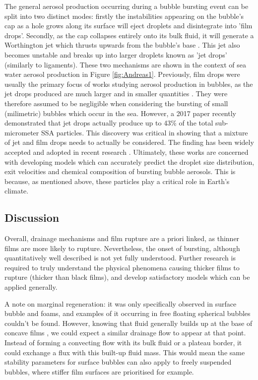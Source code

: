 \documentclass[a4paper,12pt]{article}
\numberwithin{equation}{section}
\numberwithin{figure}{section}
\numberwithin{table}{section}
\begin{document}
The general aerosol production occurring during a bubble bursting event can be split into two distinct modes: firstly the instabilities appearing on the bubble's cap as a hole grows along its surface will eject droplets and disintegrate into 'film drops'. Secondly, as the cap collapses entirely onto its bulk fluid, it will generate a Worthington jet which thrusts upwards from the bubble's base \cite{Lhuissier2011}. This jet also becomes unstable and breaks up into larger droplets known as 'jet drops' \cite{Spiel1998, Lhuissier2011} (similarly to ligaments). These two mechanisms are shown in the context of sea water aerosol production in Figure \ref{fig:Andreas1}. Previously, film drops were usually the primary focus of works studying aerosol production in bubbles, as the jet drops produced are much larger and in smaller quantities \cite{Wu1989, Modini2013, Spiel1998, Lhuissier2011}. They were therefore assumed to be negligible when considering the bursting of small (milimetric) bubbles which occur in the sea. However, a 2017 paper \cite{Wang2017} recently demonstrated that jet drops actually produce up to 43\% of the total sub-micrometer SSA particles. This discovery was critical in showing that a mixture of jet and film drops needs to actually be considered. The finding has been widely accepted and adopted in recent research \cite{Bertram2018, Deike2018}. Ultimately, these works are concerned with developing models which can accurately predict the droplet size distribution, exit velocities and chemical composition of bursting bubble aerosols. This is because, as mentioned above, these particles play a critical role in Earth's climate.

\subsection{Discussion}
Overall, drainage mechanisms and film rupture are a priori linked, as thinner films are more likely to rupture. Nevertheless, the onset of bursting, although quantitatively well described is not yet fully understood. Further research is required to truly understand the physical phenomena causing thicker films to rupture (thicker than black films), and develop satisfactory models which can be applied generally.

A note on marginal regeneration: it was only specifically observed in surface bubble and foams, and examples of it occurring in free floating spherical bubbles couldn't be found. However, knowing that fluid generally builds up at the base of concave films \cite{Shen2020}, we could expect a similar drainage flow to appear at that point. Instead of forming a convecting flow with its bulk fluid or a plateau border, it could exchange a flux with this built-up fluid mass. This would mean the same stability parameters for surface bubbles can also apply to freely suspended bubbles, where stiffer film surfaces are prioritised for example.
\end{document}
